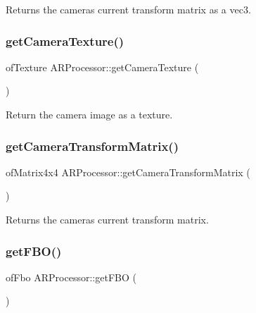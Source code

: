 Returns the camera\textquotesingle{}s current transform matrix as a vec3. 

\mbox{\label{class_a_r_processor_a5eb8045000bc6e0ad3d41d7bbf832047}} 
\subsubsection{\texorpdfstring{get\+Camera\+Texture()}{getCameraTexture()}}
{\footnotesize\ttfamily of\+Texture A\+R\+Processor\+::get\+Camera\+Texture (\begin{DoxyParamCaption}{ }\end{DoxyParamCaption})}



Return the camera image as a texture. 

\mbox{\label{class_a_r_processor_aea093b6d054daa0c75de6f7a492a19ff}} 
\subsubsection{\texorpdfstring{get\+Camera\+Transform\+Matrix()}{getCameraTransformMatrix()}}
{\footnotesize\ttfamily of\+Matrix4x4 A\+R\+Processor\+::get\+Camera\+Transform\+Matrix (\begin{DoxyParamCaption}{ }\end{DoxyParamCaption})\hspace{0.3cm}{\ttfamily [inline]}}



Returns the camera\textquotesingle{}s current transform matrix. 

\mbox{\label{class_a_r_processor_a8436dc786e91fb933879d90a4ab396d5}} 
\subsubsection{\texorpdfstring{get\+F\+B\+O()}{getFBO()}}
{\footnotesize\ttfamily of\+Fbo A\+R\+Processor\+::get\+F\+BO (\begin{DoxyParamCaption}{ }\end{DoxyParamCaption})\hspace{0.3cm}{\ttfamily [inline]}}



